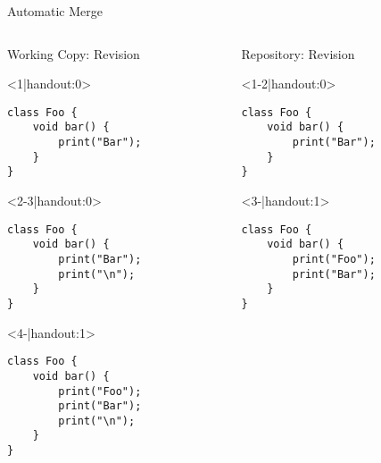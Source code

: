 \begin{frame}[fragile]{Automatic Merge}
	\begin{columns}[onlytextwidth]
		\begin{column}{0.6\linewidth}
			\begin{columns}[T]
				\begin{column}{0.5\linewidth}
					Working Copy: Revision \only<4>{\emph{11$^*$}}\\[2mm]
					
					\begin{onlyenv}<1|handout:0>
						\begin{lstlisting}[style=java,basicstyle=\fontfamily{pcr}\small\selectfont,numbers=none,escapechar=|]
class Foo {
	void bar() {
		print("Bar");
	}
}	
						\end{lstlisting}
					\end{onlyenv}
					\begin{onlyenv}
						\begin{lstlisting}[style=java,basicstyle=\fontfamily{pcr}\small\selectfont,numbers=none,escapechar=|]
class Foo {
	void bar() {
		print("Bar");
		print("\n");
	}
}	
						\end{lstlisting}
					\end{onlyenv}
					\begin{onlyenv}
						\begin{lstlisting}[style=java,basicstyle=\fontfamily{pcr}\small\selectfont,numbers=none,escapechar=|]
class Foo {
	void bar() {
		print("Foo");
		print("Bar");
		print("\n");
	}
}	
						\end{lstlisting}
					\end{onlyenv}
				\end{column}
				\begin{column}{0.5\linewidth}					
					Repository: Revision \only<3->{\emph{11}}
					
					\begin{onlyenv}
						\begin{lstlisting}[style=java,basicstyle=\fontfamily{pcr}\small\selectfont,numbers=none,escapechar=|]
class Foo {
	void bar() {
		print("Bar");
	}
}
						\end{lstlisting}
					\end{onlyenv}
					\begin{onlyenv}
						\begin{lstlisting}[style=java,basicstyle=\fontfamily{pcr}\small\selectfont,numbers=none,escapechar=|]
class Foo {
	void bar() {
		print("Foo");
		print("Bar");
	}
}
						\end{lstlisting}
					\end{onlyenv}
				\end{column}
			\end{columns}
			

\end{column}
\end{columns}
\end{frame}
